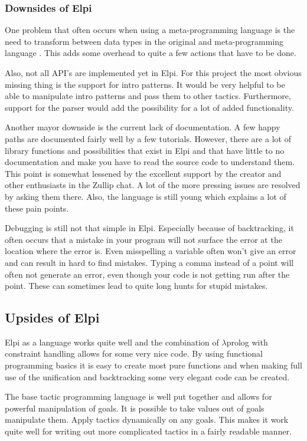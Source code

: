 \documentclass[thesis.tex]{subfiles}
\begin{document}
{{{\subsubsection*{Downsides of Elpi}
One problem that often occurs when using a meta-programming language is the need to transform between data types in the original and meta-programming language \cite*{}. This adds some overhead to quite a few actions that have to be done.

Also, not all API's are implemented yet in Elpi. For this project the most obvious missing thing is the support for \coq intro patterns. It would be very helpful to be able to manipulate \coq intro patterns and pass them to other tactics. Furthermore, support for the \coq parser would add the possibility for a lot of added functionality.

Another mayor downside is the current lack of documentation. A few happy paths are documented fairly well by a few tutorials. However, there are a lot of library functions and possibilities that exist in Elpi and \ce that have little to no documentation and make you have to read the source code to understand them. This point is somewhat lessened by the excellent support by the creator and other enthusiasts in the Zullip chat. A lot of the more pressing issues are resolved by asking them there. Also, the language is still young which explains a lot of these pain points.

Debugging is still not that simple in Elpi. Especially because of backtracking, it often occurs that a mistake in your program will not surface the error at the location where the error is. Even misspelling a variable often won't give an error and can result in hard to find mistakes. Typing a comma instead of a point will often not generate an error, even though your code is not getting run after the point. These can sometimes lead to quite long hunts for stupid mistakes.

\subsection*{Upsides of Elpi}
Elpi as a language works quite well and the combination of $\lambda$prolog with constraint handling allows for some very nice code. By using functional programming basics it is easy to create most pure functions and when making full use of the unification and backtracking some very elegant code can be created.

The base tactic programming language is well put together and allows for powerful manipulation of goals. It is possible to take values out of goals manipulate them. Apply tactics dynamically on any goals. This makes it work quite well for writing out more complicated tactics in a fairly readable manner.

}}}
\end{document}
